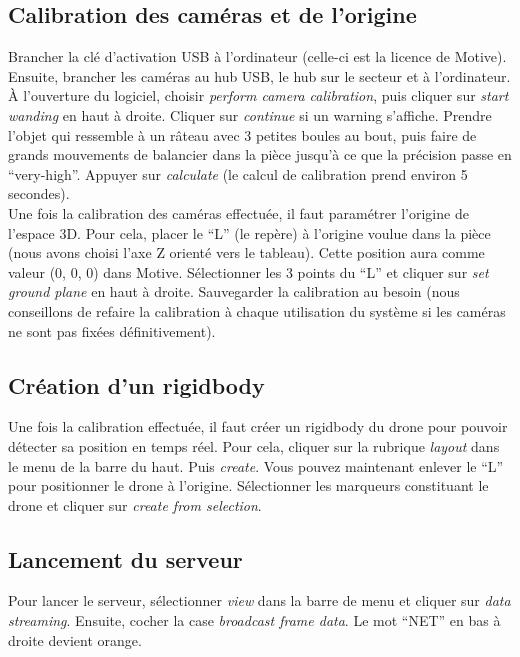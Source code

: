         \subsection{Calibration des caméras et de l'origine}
            Brancher la clé d'activation USB à l'ordinateur (celle-ci est la licence de Motive). Ensuite, brancher les caméras au hub USB, le hub sur le secteur et à l'ordinateur. À l'ouverture du logiciel, choisir \emph{perform camera calibration}, puis cliquer sur \emph{start wanding} en haut à droite. Cliquer sur \emph{continue} si un warning s'affiche. Prendre l'objet qui ressemble à un râteau avec 3 petites boules au bout, puis faire de grands mouvements de balancier dans la pièce jusqu'à ce que la précision passe en ``very-high''. Appuyer sur \emph{calculate} (le calcul de calibration prend environ 5 secondes). \\

            Une fois la calibration des caméras effectuée, il faut paramétrer l'origine de l'espace 3D. Pour cela, placer le ``L'' (le repère) à l'origine voulue dans la pièce (nous avons choisi l'axe Z orienté vers le tableau). Cette position aura comme valeur (0, 0, 0) dans Motive. Sélectionner les 3 points du ``L'' et cliquer sur \emph{set ground plane} en haut à droite. Sauvegarder la calibration au besoin (nous conseillons de refaire la calibration à chaque utilisation du système si les caméras ne sont pas fixées définitivement).

        \subsection{Création d'un rigidbody}
            Une fois la calibration effectuée, il faut créer un rigidbody du drone pour pouvoir détecter sa position en temps réel. Pour cela, cliquer sur la rubrique \emph{layout} dans le menu de la barre du haut. Puis \emph{create}. Vous pouvez maintenant enlever le ``L'' pour positionner le drone à l'origine. Sélectionner les marqueurs constituant le drone et cliquer sur \emph{create from selection}.

        \subsection{Lancement du serveur}
            Pour lancer le serveur, sélectionner \emph{view} dans la barre de menu et cliquer sur \emph{data streaming}. Ensuite, cocher la case \emph{broadcast frame data}. Le mot ``NET'' en bas à droite devient orange.



